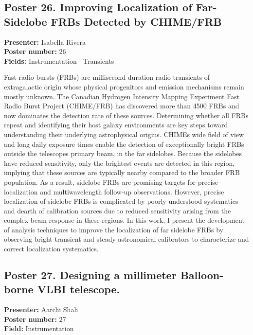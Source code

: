 \hypertarget{poster-abstract-talk-247}{}\label{poster-abstract-page-talk-247}
\subsection*{Poster 26. Improving Localization of Far-Sidelobe FRBs Detected by CHIME/FRB}
\textbf{Presenter:} Isabella Rivera\\
\textbf{Poster number:} 26\\
\textbf{Fields:} Instrumentation $\cdot$ Transients

Fast radio bursts (FRBs) are millisecond-duration radio transients of extragalactic origin whose physical progenitors and emission mechanisms remain mostly unknown. The Canadian Hydrogen Intensity Mapping Experiment Fast Radio Burst Project (CHIME/FRB) has discovered more than 4500 FRBs and now dominates the detection rate of these sources. Determining whether all FRBs repeat and identifying their host galaxy environments are key steps toward understanding their underlying astrophysical origins. CHIMEs wide field of view and long daily exposure times enable the detection of exceptionally bright FRBs outside the telescopes primary beam, in the far sidelobes. Because the sidelobes have reduced sensitivity, only the brightest events are detected in this region, implying that these sources are typically nearby compared to the broader FRB population. As a result, sidelobe FRBs are promising targets for precise localization and multiwavelength follow-up observations. However, precise localization of sidelobe FRBs is complicated by poorly understood systematics and dearth of calibration sources due to reduced sensitivity arising from the complex beam response in these regions. In this work, I present the development of analysis techniques to improve the localization of far sidelobe FRBs by observing bright transient and steady astronomical calibrators to characterize and correct localization systematics.

\hypertarget{poster-abstract-talk-83}{}\label{poster-abstract-page-talk-83}
\subsection*{Poster 27. Designing a millimeter Balloon-borne VLBI telescope.}
\textbf{Presenter:} Aarchi Shah\\
\textbf{Poster number:} 27\\
\textbf{Field:} Instrumentation

